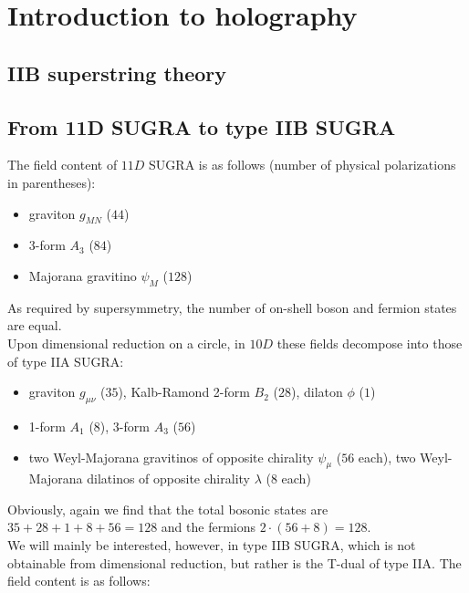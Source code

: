 \documentclass[11pt,a4paper,twoside,openright]{book}
\author{Riccardo Antonelli}
\begin{document}
\frontmatter

\tableofcontents

\mainmatter

\chapter{Introduction to holography}

\section{IIB superstring theory}

\section{From 11D SUGRA to type IIB SUGRA}

The field content of $11D$ SUGRA is as follows (number of physical polarizations in parentheses):

\begin{itemize}
\item graviton $g_{MN}$ ($44$)
\item 3-form $A_3$ ($84$)
\item Majorana gravitino $\psi_M$ ($128$)
\end{itemize}

As required by supersymmetry, the number of on-shell boson and fermion states are equal.\\

Upon dimensional reduction on a circle, in $10D$ these fields decompose into those of type IIA SUGRA:

\begin{itemize}
\item graviton $g_{\mu\nu}$ ($35$), Kalb-Ramond 2-form $B_2$ ($28$), dilaton $\phi$ ($1$)
\item 1-form $A_1$ ($8$), 3-form $A_3$ ($56$)
\item two Weyl-Majorana gravitinos of opposite chirality $\psi_\mu$ ($56$ each), two Weyl-Majorana dilatinos of opposite chirality $\lambda$ ($8$ each)
\end{itemize}

Obviously, again we find that the total bosonic states are $35+28+1+8+56 = 128$ and the fermions $2\cdot (56+8) = 128$.\\

We will mainly be interested, however, in type IIB SUGRA, which is not obtainable from dimensional reduction, but rather is the T-dual of type IIA. The field content is as follows:
\end{document}
